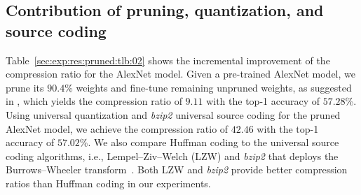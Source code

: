 \documentclass{article}
\theoremstyle{remark}
\begin{document}
\subsection{Contribution of pruning, quantization, and source coding}

Table~\ref{sec:exp:res:pruned:tlb:02} shows the incremental improvement of the compression ratio for the AlexNet model. Given a pre-trained AlexNet model, we prune its $90.4$\% weights and fine-tune remaining unpruned weights, as suggested in \cite{han2015learning}, which yields the compression ratio of $9.11$ with the top-1 accuracy of $57.28$\%. %
Using universal quantization and \emph{bzip2} universal source coding for the pruned AlexNet model, we achieve the compression ratio of $42.46$ with the top-1 accuracy of $57.02$\%. %
We also compare Huffman coding to the universal source coding algorithms, i.e., Lempel--Ziv--Welch (LZW) and \emph{bzip2} that deploys the Burrows--Wheeler transform~\cite{effros2002universal}. Both LZW and \emph{bzip2} provide better compression ratios than Huffman coding in our experiments.
\end{document}
